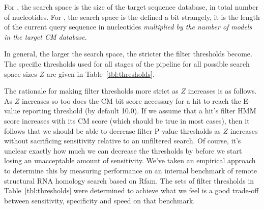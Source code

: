 For , the search space is the size of the target
sequence database, in total number of nucleotides. For ,
the search space is the defined a bit strangely, it is the length of
the current query sequence in nucleotides \emph{multiplied by the
number of models in the target CM database}.

In general, the larger the search space, the stricter the filter
thresholds become. The specific thresholds used for all stages of the
pipeline for all possible search space sizes $Z$ are given in
Table~\ref{tbl:thresholds}.

The rationale for making filter thresholds more strict as $Z$
increases is as follows. As $Z$ increases so too does the CM bit score
necessary for a hit to reach the E-value reporting threshold (by
default 10.0). If we assume that a hit's filter HMM score increases
with its CM score (which should be true in most cases), then it
follows that we should be able to decrease filter P-value thresholds
as $Z$ increases without sacrificing sensitivity relative to an
unfiltered search. Of course, it's unclear exactly how much we can
decrease the thresholds by before we start losing an unacceptable
amount of sensitivity. We've taken an empirical approach to determine
this by measuring performance on an internal benchmark of remote
structural RNA homology search based on Rfam. The sets of filter
thresholds in Table~\ref{tbl:thresholds} were determined to achieve
what we feel is a good trade-off between sensitivity, specificity and
speed on that benchmark.

